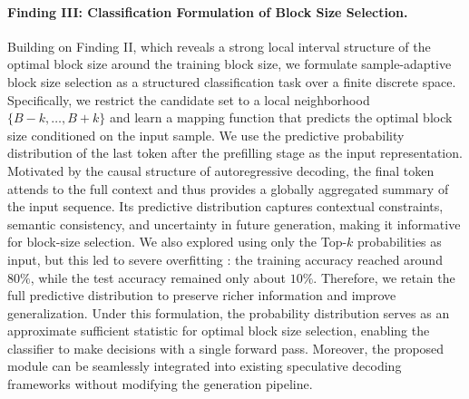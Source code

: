 \documentclass{article}
\begin{document}
\paragraph{Finding III: Classification Formulation of Block Size Selection.}

Building on Finding II, which reveals a strong local interval structure of the optimal block size around the training block size, we formulate sample-adaptive block size selection as a structured classification task over a finite discrete space. Specifically, we restrict the candidate set to a local neighborhood $\{B-k, \ldots, B+k\}$ and learn a mapping function that predicts the optimal block size conditioned on the input sample. We use the predictive probability distribution of the last token after the prefilling stage as the input representation. Motivated by the causal structure of autoregressive decoding, the final token attends to the full context and thus provides a globally aggregated summary of the input sequence. Its predictive distribution captures contextual constraints, semantic consistency, and uncertainty in future generation, making it informative for block-size selection. We also explored using only the Top-$k$ probabilities as input, but this led to severe overfitting \cite{hinton2015distilling,berrada2018smooth}: the training accuracy reached around $80\%$, while the test accuracy remained only about $10\%$. Therefore, we retain the full predictive distribution to preserve richer information and improve generalization. Under this formulation, the probability distribution serves as an approximate sufficient statistic for optimal block size selection, enabling the classifier to make decisions with a single forward pass. Moreover, the proposed module can be seamlessly integrated into existing speculative decoding frameworks without modifying the generation pipeline.
\end{document}
